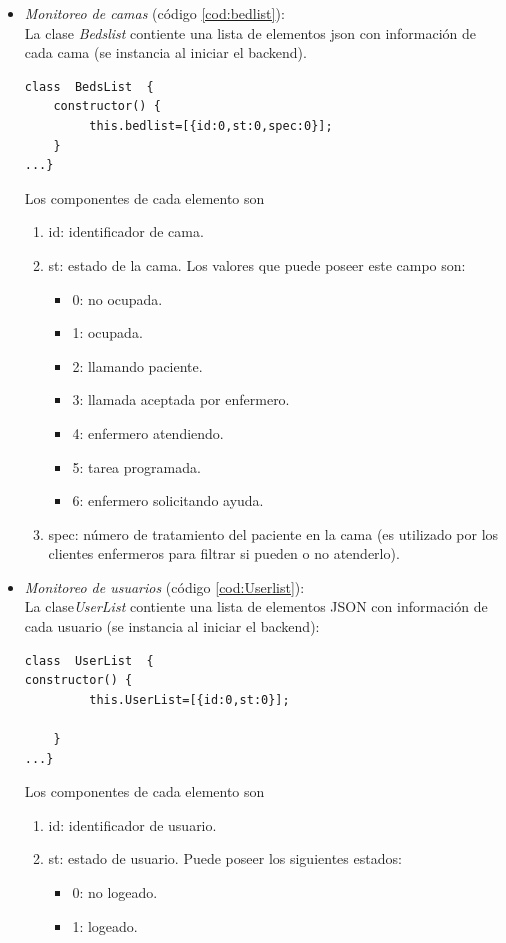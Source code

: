 \begin{itemize}

\item \textit{ Monitoreo de camas} (código \ref{cod:bedlist}):\\
La clase \textit{Bedslist} contiente una lista de elementos json con información de cada cama (se instancia al iniciar el backend).

\begin{lstlisting}[label=cod:bedlist,caption=  Clase Bedlist]
class  BedsList  {    
    constructor() {
         this.bedlist=[{id:0,st:0,spec:0}];                        
    }
...}
\end{lstlisting}

Los componentes de cada elemento son 
\begin{enumerate}
\item id: identificador de cama.
\item st: estado de la cama. Los valores que puede poseer este campo son: 
\begin{itemize}
\item 0: no ocupada.
\item 1: ocupada.
\item 2: llamando paciente.
\item 3: llamada aceptada por enfermero.
\item 4: enfermero atendiendo.
\item 5: tarea programada.
\item 6: enfermero solicitando ayuda.
\end{itemize}
\item spec: número de tratamiento del paciente en la cama (es utilizado por los clientes enfermeros para filtrar si pueden o no atenderlo).
\end{enumerate}


\item \textit{ Monitoreo de usuarios} (código \ref{cod:Userlist}):\\
La clase\textit{UserList} contiente una lista de elementos JSON con información de cada usuario (se instancia al iniciar el backend):

\begin{lstlisting}[label=cod:Userlist,caption=  Clase Userlist]
class  UserList  {   
constructor() {
         this.UserList=[{id:0,st:0}];                
        
    }
...}
\end{lstlisting}

Los componentes de cada elemento son 
	\begin{enumerate}
		\item id: identificador de usuario.
		\item st: estado de usuario. Puede poseer los siguientes estados: 
			\begin{itemize}
				\item 0: no logeado.
				\item 1: logeado.
			\end{itemize}
	\end{enumerate}





\end{itemize}
